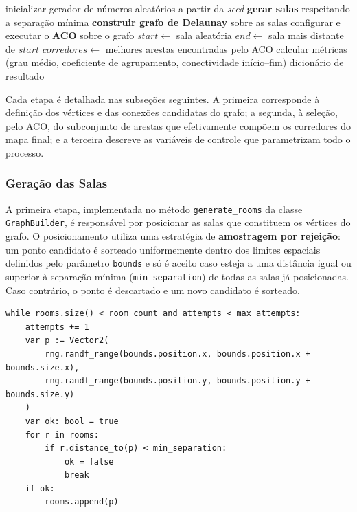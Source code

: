 \documentclass[12pt]{article}
\begin{document}
\begin{algorithm}
\caption{Pipeline de geração procedural (\texttt{DungeonGenerator.generate})}
\label{alg:pipeline}
\begin{algorithmic}[1]
\State inicializar gerador de números aleatórios a partir da \textit{seed}
\State \textbf{gerar salas} respeitando a separação mínima 
\State \textbf{construir grafo de Delaunay} sobre as salas 
\State configurar e executar o \textbf{ACO} sobre o grafo
\State $start \gets$ sala aleatória
\State $end \gets$ sala mais distante de $start$
\State $corredores \gets$ melhores arestas encontradas pelo ACO
\State calcular métricas (grau médio, coeficiente de agrupamento, conectividade início--fim)
\State \Return dicionário de resultado
\end{algorithmic}
\end{algorithm}
 
Cada etapa é detalhada nas subseções seguintes. A primeira corresponde à definição dos vértices e das conexões candidatas do
grafo; a segunda, à seleção, pelo ACO, do subconjunto de arestas que efetivamente compõem os corredores do mapa final; e a
terceira descreve as variáveis de controle que parametrizam todo o processo.
 
\subsubsection{Geração das Salas}
A primeira etapa, implementada no método \texttt{generate\_rooms} da classe \texttt{GraphBuilder}, é responsável por posicionar as
salas que constituem os vértices do grafo. O posicionamento utiliza uma estratégia de \textbf{amostragem por rejeição}: um ponto
candidato é sorteado uniformemente dentro dos limites espaciais definidos pelo parâmetro \texttt{bounds} e só é aceito caso esteja
a uma distância igual ou superior à separação mínima (\texttt{min\_separation}) de todas as salas já posicionadas. Caso contrário,
o ponto é descartado e um novo candidato é sorteado.
 
\begin{lstlisting}[caption={Amostragem por rejeição para o posicionamento das salas.}, label={lst:rooms}]
while rooms.size() < room_count and attempts < max_attempts:
    attempts += 1
    var p := Vector2(
        rng.randf_range(bounds.position.x, bounds.position.x + bounds.size.x),
        rng.randf_range(bounds.position.y, bounds.position.y + bounds.size.y)
    )
    var ok: bool = true
    for r in rooms:
        if r.distance_to(p) < min_separation:
            ok = false
            break
    if ok:
        rooms.append(p)
\end{lstlisting}
 
\end{document}

